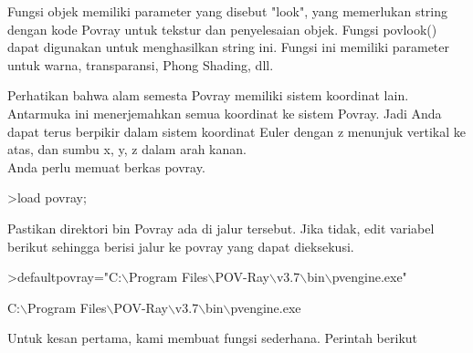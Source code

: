 \documentclass[a4paper,10pt]{article}
\begin{document}
\begin{eulernotebook}
\begin{eulercomment}
\begin{eulercomment}
\begin{eulercomment}
\begin{eulercomment}
\begin{eulercomment}
\begin{eulercomment}
\begin{eulercomment}
\begin{eulercomment}
\begin{eulercomment}
\begin{eulercomment}
\begin{eulercomment}
\begin{eulercomment}
\begin{eulercomment}
\begin{eulercomment}
\begin{eulercomment}
\begin{eulercomment}
\begin{eulercomment}
\begin{eulercomment}
\begin{eulercomment}
\begin{eulercomment}
\begin{eulercomment}
\begin{eulercomment}
\begin{eulercomment}
\begin{eulercomment}
\begin{eulercomment}
\begin{eulercomment}
\begin{eulercomment}
\begin{eulercomment}
\begin{eulercomment}
\begin{eulercomment}
\begin{eulercomment}
\begin{eulercomment}
\begin{eulercomment}
\begin{eulercomment}
\begin{eulercomment}
\begin{eulercomment}
\begin{eulercomment}
\begin{eulercomment}
\begin{eulercomment}
\begin{eulercomment}
\begin{eulercomment}
Fungsi objek memiliki parameter yang disebut "look", yang memerlukan
string dengan kode Povray untuk tekstur dan penyelesaian objek. Fungsi
povlook() dapat digunakan untuk menghasilkan string ini. Fungsi ini
memiliki parameter untuk warna, transparansi, Phong Shading, dll.

Perhatikan bahwa alam semesta Povray memiliki sistem koordinat lain.
Antarmuka ini menerjemahkan semua koordinat ke sistem Povray. Jadi
Anda dapat terus berpikir dalam sistem koordinat Euler dengan z
menunjuk vertikal ke atas, dan sumbu x, y, z dalam arah kanan.\\
Anda perlu memuat berkas povray.
\end{eulercomment}
\begin{eulerprompt}
>load povray;
\end{eulerprompt}
\begin{eulercomment}
Pastikan direktori bin Povray ada di jalur tersebut. Jika tidak, edit
variabel berikut sehingga berisi jalur ke povray yang dapat
dieksekusi.
\end{eulercomment}
\begin{eulerprompt}
>defaultpovray="C:\(\backslash\)Program Files\(\backslash\)POV-Ray\(\backslash\)v3.7\(\backslash\)bin\(\backslash\)pvengine.exe"
\end{eulerprompt}
\begin{euleroutput}
  C:\(\backslash\)Program Files\(\backslash\)POV-Ray\(\backslash\)v3.7\(\backslash\)bin\(\backslash\)pvengine.exe
\end{euleroutput}
\begin{eulercomment}
Untuk kesan pertama, kami membuat fungsi sederhana. Perintah berikut

\end{eulercomment}
\end{eulercomment}
\end{eulercomment}
\end{eulercomment}
\end{eulercomment}
\end{eulercomment}
\end{eulercomment}
\end{eulercomment}
\end{eulercomment}
\end{eulercomment}
\end{eulercomment}
\end{eulercomment}
\end{eulercomment}
\end{eulercomment}
\end{eulercomment}
\end{eulercomment}
\end{eulercomment}
\end{eulercomment}
\end{eulercomment}
\end{eulercomment}
\end{eulercomment}
\end{eulercomment}
\end{eulercomment}
\end{eulercomment}
\end{eulercomment}
\end{eulercomment}
\end{eulercomment}
\end{eulercomment}
\end{eulercomment}
\end{eulercomment}
\end{eulercomment}
\end{eulercomment}
\end{eulercomment}
\end{eulercomment}
\end{eulercomment}
\end{eulercomment}
\end{eulercomment}
\end{eulercomment}
\end{eulercomment}
\end{eulercomment}
\end{eulercomment}
\end{eulernotebook}
\end{document}
